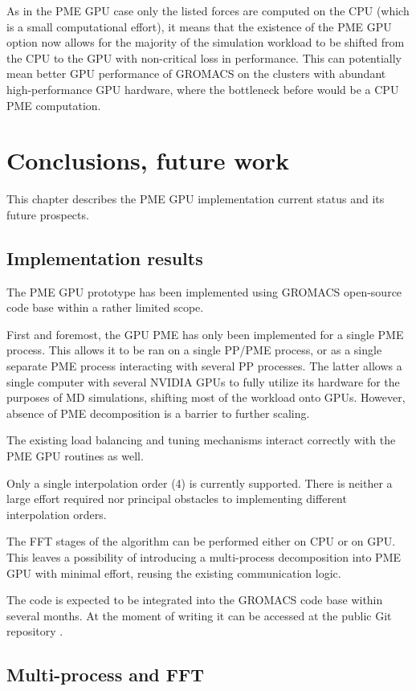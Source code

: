 \documentclass[12pt,a4paper,notitlepage]{report}
\begin{document}
As in the PME GPU case only the listed forces are computed on the CPU (which is a small computational effort), it means that the existence of the PME GPU option now allows for the majority of the simulation workload to be shifted from the CPU to the GPU with non-critical loss in performance. This can potentially mean better GPU performance of GROMACS on the clusters with abundant high-performance GPU hardware, where the bottleneck before would be a CPU PME computation.
\fi

\newpage
\chapter{Conclusions, future work}
This chapter describes the PME GPU implementation current status and its future prospects.

\section{Implementation results}
The PME GPU prototype has been implemented using GROMACS open-source code base within a rather limited scope. 

First and foremost, the GPU PME has only been implemented for a single PME process. This allows it to be ran on a single PP/PME process, or as a single separate PME process interacting with several PP processes. The latter allows a single computer with several NVIDIA GPUs to fully utilize its hardware for the purposes of MD simulations, shifting most of the workload onto GPUs. However, absence of PME decomposition is a barrier to further scaling.

The existing load balancing and tuning mechanisms interact correctly with the PME GPU routines as well. 

Only a single interpolation order (4) is currently supported. There is neither a large effort required nor principal obstacles to implementing different interpolation orders. 

The FFT stages of the algorithm can be performed either on CPU or on GPU. This leaves a possibility of introducing a multi-process decomposition into PME GPU with minimal effort, reusing the existing communication logic.

The code is expected to be integrated into the GROMACS code base within several months. At the moment of writing it can be accessed at the public Git repository \cite{pmegpugit}.

\section{Multi-process and FFT}
\end{document}
